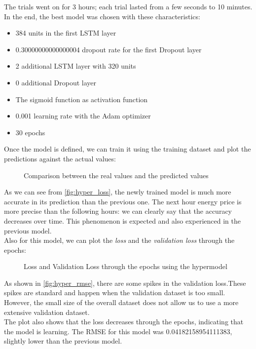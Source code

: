 The trials went on for 3 hours; each trial lasted from a few seconds to 10 minutes. In the end, the best model was chosen with these characteristics:
\begin{itemize}
    \item 384 units in the first LSTM layer
    \item 0.30000000000000004 dropout rate for the first Dropout layer
    \item 2 additional LSTM layer with 320 units
    \item 0 additional Dropout layer
    \item The sigmoid function as activation function
    \item 0.001 learning rate with the Adam optimizer
    \item 30 epochs
\end{itemize}
Once the model is defined, we can train it using the training dataset and plot the predictions against the actual values:
\begin{figure}[H]
    \centering
    
    \caption{Comparison between the real values and the predicted values}
    \label{fig:hyper_loss}
\end{figure}
As we can see from \autoref{fig:hyper_loss}, the newly trained model is much more accurate in its prediction than the previous one. The next hour energy price is more precise than the following hours: we can clearly say that the accuracy decreases over time. This phenomenon is expected and also experienced in the previous model. \\
Also for this model, we can plot the \textit{loss} and the \textit{validation loss} through the epochs:
\begin{figure}[H]
    \centering
    
    \caption{Loss and Validation Loss through the epochs using the hypermodel}
    \label{fig:hyper_rmse}
\end{figure}
As shown in \autoref{fig:hyper_rmse}, there are some spikes in the validation loss.These spikes are standard and happen when the validation dataset is too small. However, the small size of the overall dataset does not allow us to use a more extensive validation dataset.  \\
The plot also shows that the loss decreases through the epochs, indicating that the model is learning. The RMSE for this model was 0.04182158954111383, slightly lower than the previous model. \\ 
